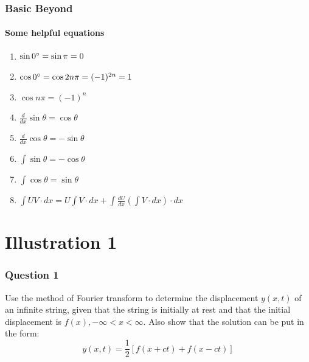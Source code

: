 \documentclass[9 pt]{beamer}
\begin{document}
\begin{frame}
\frametitle{Basic Beyond}
\framesubtitle{Some helpful equations}

\begin{enumerate}

	\item<+-| alert@+> $\sin 0\degree = \sin \pi = 0$
	\item<+-| alert@+> $\cos 0\degree = \cos 2n\pi = (-1)^{2n} = 1$
	\item<+-| alert@+> $\cos n\pi = (-1)^n$
	\item<+-| alert@+> $\frac{d}{dx} \sin\theta = \cos\theta$
	\item<+-| alert@+> $\frac{d}{dx} \cos\theta = -\sin\theta$
	\item<+-| alert@+> $\int \sin\theta = -\cos\theta$
	\item<+-| alert@+> $\int \cos\theta = \sin\theta$
	\item<+-| alert@+> $\int UV\cdot dx=U\int V\cdot dx+\int \frac{dU}{dx}(\int V\cdot dx)\cdot dx$
	
\transfade[duration=0.15]
\end{enumerate}

\end{frame}

\section{Illustration 1}

\begin{frame}[fragile]
\frametitle{Question 1}
\begin{block}{1}
Use the method of Fourier transform to determine the displacement $y(x, t)$ of an infinite string, given that the string is initially at rest and that the initial displacement is $f(x), -\infty < x < \infty$. Also show that the solution can be put in the form:
\begin{displaymath}
y(x, t)=\frac{1}{2}\left[f(x+ct)+f(x-ct)\right]
\end{displaymath}
\end{block}

\transwipe[duration=0.6]
\end{frame}
\end{document}

